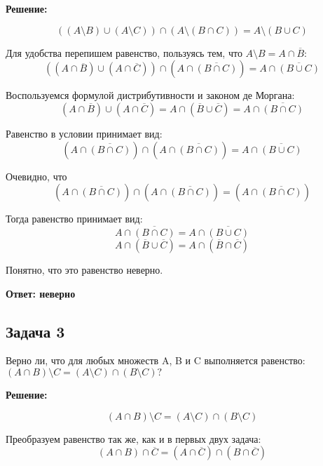 \documentclass[a4paper,14pt]{article} %
\begin{document}
\begin{center}
\bfseries
{\Large Решение: }
\end{center}

\[((A\setminus B) \cup (A\setminus C)) \cap (A\setminus(B\cap C))=A\setminus (B\cup C)\]

Для удобства перепишем равенство, пользуясь тем, что $A\setminus B = A\cap \overline{B}$:
\[((A\cap \overline{B}) \cup (A\cap \overline{C})) \cap (A\cap \overline{(B\cap C)})=A \cap \overline{(B\cup C)}\]

Воспользуемся формулой дистрибутивности и законом де Моргана:
\[(A\cap \overline{B}) \cup (A\cap \overline{C})= A\cap (\overline{B} \cup \overline{C}) = A\cap \overline{(B \cap C)}\]

Равенство в условии принимает вид:
\[(A\cap \overline{(B \cap C)})\cap (A\cap \overline{(B\cap C)})=A \cap \overline{(B\cup C)}\]

Очевидно, что
\[(A\cap \overline{(B \cap C)})\cap (A\cap \overline{(B\cap C)}) = (A\cap \overline{(B\cap C)})\]

Тогда равенство принимает вид:
\[A\cap \overline{(B\cap C)} = A \cap \overline{(B\cup C)}\]
\[A\cap (\overline{B} \cup \overline{C}) = A \cap (\overline{B} \cap \overline{C})\]


Понятно, что это равенство неверно.

\begin{flushright}
\begin{large}
\textbf {Ответ: неверно}
\end{large}
\end{flushright}

\newpage
\begin{center}
\subsection{Задача 3}
\end{center}

Верно ли, что для любых множеств A, B и C выполняется равенство: $(A \cap B) \setminus C = (A \setminus C) \cap (B \setminus C)?$
\begin{center}
\bfseries
{\Large Решение: }
\end{center}


\[(A\cap B)\setminus C = (A\setminus C) \cap (B\setminus C)\]

Преобразуем равенство так же, как и в первых двух задача:
\[(A\cap B)\cap \overline{C} = (A\cap \overline{C}) \cap (B\cap \overline{C})\]
\end{document}
